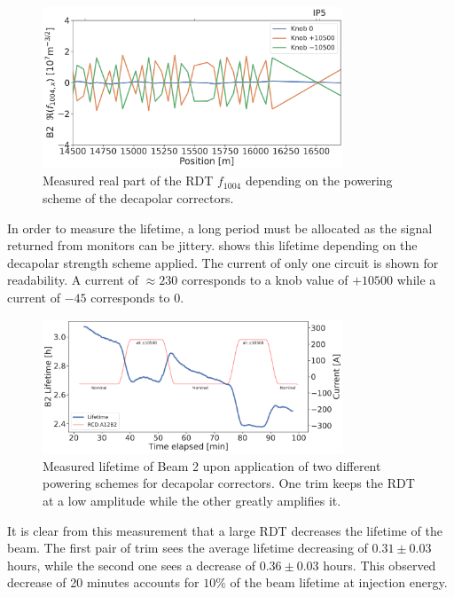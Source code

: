 \begin{figure}[!htb]
    \centering
    \includegraphics[width=0.8\textwidth]{./images/f1004/f1004x_knob_alt_lifetime_real.pdf}
    \caption{Measured real part of the RDT $f_{1004}$ depending on the powering scheme of the decapolar
    correctors.}
    \label{fig:decapoles:impact:alternating_knob}
\end{figure}

In order to measure the lifetime, a long period must be allocated as the signal returned from
monitors can be jittery.  shows this lifetime depending on
the decapolar strength scheme applied. The current of only one circuit is shown for readability.
A current of $\approx 230$ corresponds to a knob value of $+10500$ while a current of $-45$
corresponds to $0$.

\begin{figure}[!htb]
    \centering
    \includegraphics[width=0.8\textwidth]{./images/b5_lifetime.pdf}
    \caption{Measured lifetime of Beam 2 upon application of two different powering schemes for
    decapolar correctors. One trim keeps the RDT at a low amplitude while the other greatly
    amplifies it.}
    \label{fig:decapoles:impact:b5_lifetime}
\end{figure}

It is clear from this measurement that a large RDT decreases the lifetime of the beam.
The first pair of trim sees the average lifetime decreasing of $0.31 \pm 0.03$ hours, while the
second one sees a decrease of $0.36 \pm 0.03$ hours. This observed decrease of 20 minutes accounts
for $10\%$ of the beam lifetime at injection energy.



